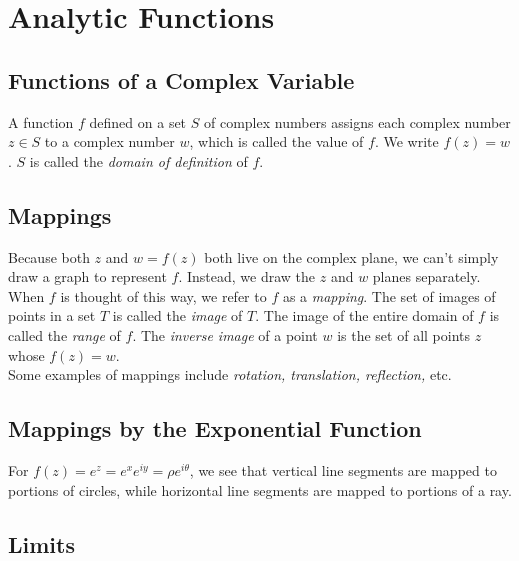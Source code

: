 \documentclass{book}
\theoremstyle{definition}
\begin{document}
\newpage



\chapter{Analytic Functions}





\section{Functions of a Complex Variable}

A function $f$ defined on a set $S$ of complex numbers assigns each complex number $z \in S$ to a complex number $w$, which is called the value of $f$. We write $f(z) = w$. $S$ is called the \textit{domain of definition} of $f$.  



\section{Mappings}
Because both $z$ and $w = f(z)$ both live on the complex plane, we can't simply draw a graph to represent $f$. Instead, we draw the $z$ and $w$ planes separately. When $f$ is thought of this way, we refer to $f$ as a \textit{mapping}. The set of images of points in a set $T$ is called the \textit{image} of $T$. The image of the entire domain of $f$ is called the \textit{range} of $f$. The \textit{inverse image} of a point $w$ is the set of all points $z$ whose $f(z) = w$. \\

Some examples of mappings include \textit{rotation, translation, reflection,} etc. 



\section{Mappings by the Exponential Function}

For $f(z) = e^z = e^x e^{iy} = \rho e^{i\theta}$, we see that vertical line segments are mapped to portions of circles, while horizontal line segments are mapped to portions of a ray. 




\section{Limits}
\end{document}
